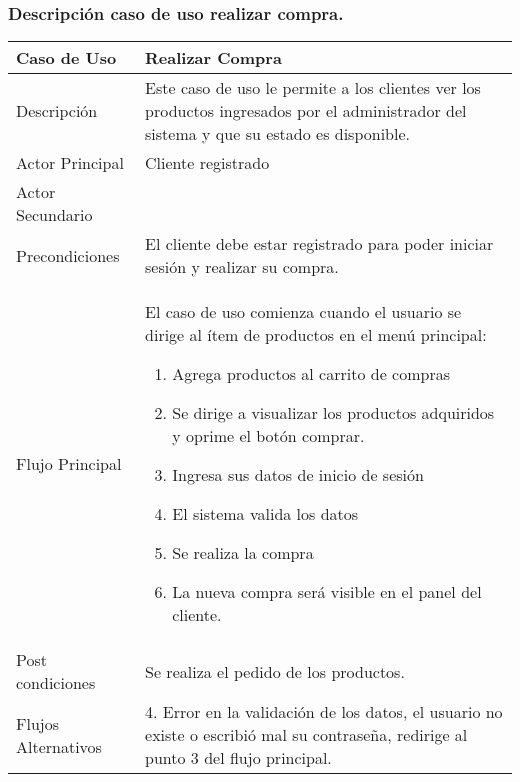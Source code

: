 \documentclass[12pt,a4paper]{article}
\begin{document}
\subsubsection*{Descripción caso de uso realizar compra.}
\begin{table}[h]
        \centering
        \begin{tabular}{| p{3cm}| p{11cm} |} 
        \hline  
        Caso de Uso         &    \textbf{ Realizar Compra}   \\ 
        \hline
        Descripción         &   Este caso de uso le permite a los clientes ver los productos ingresados por el administrador del sistema y que su estado es disponible.    \\ 
        \hline
        Actor Principal     &    Cliente registrado  \\ 
        \hline
        Actor Secundario    &       \\ 
        \hline
        Precondiciones      &   El cliente debe estar registrado para poder iniciar sesión y realizar su compra.  	\\
        \hline
        Flujo Principal     &    El caso de uso comienza cuando el usuario se dirige al ítem de productos en el menú principal:

            \begin{enumerate}
                \item Agrega productos al carrito de compras
                \item Se dirige a visualizar los productos adquiridos y oprime el botón comprar.
                \item Ingresa sus datos de inicio de sesión
                \item El sistema valida los datos
                \item Se realiza la compra
                \item La nueva compra será visible en el panel del cliente.
            \end{enumerate}
        \\  
        \hline
        Post condiciones    &    Se realiza el pedido de los productos.   \\  
        \hline
        Flujos Alternativos &   4. Error en la validación de los datos, el usuario no existe o escribió mal su contraseña, redirige al punto 3 del flujo principal.    \\  
        \hline
        \end{tabular}
    \end{table}
    \newpage
\end{document}
